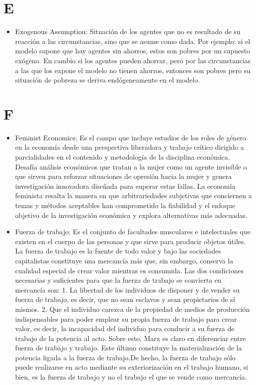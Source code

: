 \documentclass{article}
\begin{document}
\section{E}
\begin{itemize}

\item Exogenous Assumption: Situación de los agentes que no es resultado de su reacción a las circunstancias, sino que se asume como dada. Por ejemplo: si el modelo supone que hay agentes sin ahorros, estos son pobres por un supuesto exógeno. En cambio si los agentes pueden ahorrar, pero por las circunstancias  a las que los expone el modelo no tienen ahorros, entonces son pobres pero su situación de pobreza se deriva endógeneamente en el modelo.

\end{itemize}

\section{F}
\begin{itemize}

\item Feminist Economics: Es el campo que incluye estudios de los roles de género en la economía desde una perspectiva liberadora y trabajo crítico dirigido a parcialidades en el contenido y metodología de la disciplina económica. Desafía análisis económicos que tratan a la mujer como un agente invisible o que sirven para reforzar situaciones de opresión hacia la mujer y genera investigación innovadora diseñada para superar estas fallas. La economía feminista resalta la manera en que arbitrariedades subjetivas que conciernen a temas y métodos aceptables han comprometido la fiabilidad y el enfoque objetivo de la investigación económica y explora alternativas más adecuadas.

\item Fuerza de trabajo: Es el conjunto de facultades musculares e intelectuales que existen en el cuerpo de las personas y que sirve para producir objetos útiles. La fuerza de trabajo es la fuente de todo valor y bajo las sociedades capitalistas constituye una mercancía más que, sin embargo, conserva la cualidad especial de crear valor mientras es consumida. Las dos condiciones necesarias y suficientes para que la fuerza de trabajo se convierta en mercancía son: 1. La libertad de los individuos de disponer y de vender su fuerza de trabajo, es decir, que no sean esclavos y sean propietarios de sí mismos. 2. Que el individuo carezca de la propiedad de medios de producción indispensables para poder emplear su propia fuerza de trabajo para crear valor, es decir, la incapacidad del individuo para conducir a su fuerza de trabajo de la potencia al acto. Sobre esto, Marx es claro en diferenciar entre fuerza de trabajo y trabajo. Este último constituye la materialización de la potencia ligada a la fuerza de trabajo.De hecho, la fuerza de trabajo sólo puede realizarse en acto mediante su exteriorización en el trabajo humano, si bien, es la fuerza de trabajo y no el trabajo el que se vende como mercancía. 

\end{itemize}
\end{document}
